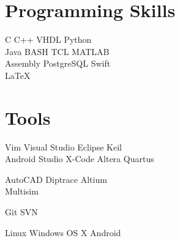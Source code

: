 \documentclass[]{deedy-resume-openfont}
\begin{document}
\begin{minipage}[t]{0.33\textwidth}
\sectionsep %


\section{Programming Skills}

\textbullet{} C \textbullet{} C++ \textbullet{} VHDL \textbullet{} Python \\
\textbullet{} Java \textbullet{}  BASH \textbullet{} TCL \textbullet{} MATLAB \\ 
\textbullet{} Assembly \textbullet{} PostgreSQL \textbullet{} Swift \\
\textbullet{} \LaTeX \\

\sectionsep %


\section{Tools}

\textbullet{} Vim \textbullet{} Visual Studio \textbullet{} Eclipse \textbullet{} Keil \\
\textbullet{} Android Studio \textbullet{} X-Code \textbullet{} Altera Quartus \\ 

\sectionsep %

\textbullet{} AutoCAD \textbullet{} Diptrace \textbullet{} Altium \\ 
\textbullet{} Multisim \\

\sectionsep %

\textbullet{} Git \textbullet{} SVN \\

\sectionsep %

\textbullet{} Linux \textbullet{} Windows \textbullet{} OS X \textbullet{} Android \\


\end{minipage}
\end{document}
